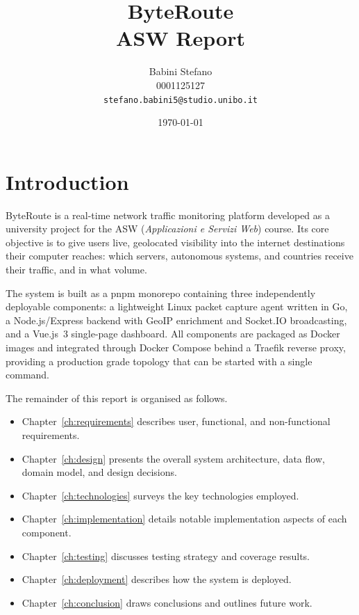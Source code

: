 \documentclass[12pt]{report}
\title{\textbf{ByteRoute} \\ \large ASW Report}
\author{
  Babini Stefano\\
  0001125127 \\
  \texttt{stefano.babini5@studio.unibo.it}
}
\date{\today}
\begin{document}
\maketitle
\newpage
\tableofcontents{}
\newpage

\chapter{Introduction}

ByteRoute is a real-time network traffic monitoring platform developed as a university project
for the ASW (\emph{Applicazioni e Servizi Web}) course. Its core objective is to give users
live, geolocated visibility into the internet destinations their computer reaches: which servers,
autonomous systems, and countries receive their traffic, and in what volume.

The system is built as a pnpm monorepo containing three independently deployable components:
a lightweight Linux packet capture agent written in Go, a Node.js/Express backend with
GeoIP enrichment and Socket.IO broadcasting, and a Vue.js~3 single-page dashboard. All
components are packaged as Docker images and integrated through Docker Compose behind a
Traefik reverse proxy, providing a production grade topology that can be started with a
single command.

The remainder of this report is organised as follows.
\begin{itemize}
      \item Chapter~\ref{ch:requirements} describes user, functional, and non-functional requirements.
      \item Chapter~\ref{ch:design} presents the overall system architecture, data flow, domain model, and
              design decisions.
      \item Chapter~\ref{ch:technologies} surveys the key technologies employed.
      \item Chapter~\ref{ch:implementation} details notable implementation aspects of each component.
      \item Chapter~\ref{ch:testing} discusses testing strategy and coverage results.
      \item Chapter~\ref{ch:deployment} describes how the system is deployed.
      \item Chapter~\ref{ch:conclusion} draws conclusions and outlines future work.
\end{itemize}
\end{document}
